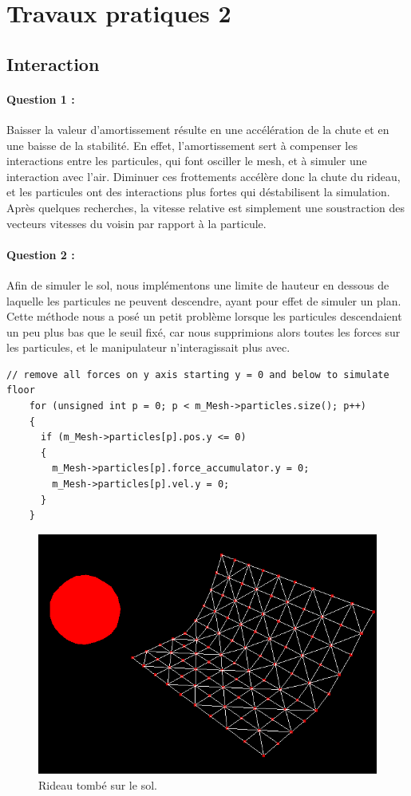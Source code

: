 \documentclass[a4paper,12pt]{article}
\begin{document}
\newpage\section{Travaux pratiques 2}

\subsection{Interaction}
\paragraph{Question 1 :} Baisser la valeur d'amortissement résulte en une accélération de la chute et en une baisse de la stabilité. En effet, l'amortissement sert à compenser les interactions entre les particules, qui font osciller le mesh, et à simuler une interaction avec l'air. Diminuer ces \og{}frottements\fg{} accélère donc la chute du rideau, et les particules ont des interactions plus fortes qui déstabilisent la simulation. Après quelques recherches, la vitesse relative est simplement une soustraction des vecteurs vitesses du voisin par rapport à la particule.

\paragraph{Question 2 :} Afin de simuler le sol, nous implémentons une limite de hauteur en dessous de laquelle les particules ne peuvent descendre, ayant pour effet de simuler un plan. Cette méthode nous a posé un petit problème lorsque les particules descendaient un peu plus bas que le seuil fixé, car nous supprimions alors toutes les forces sur les particules, et le manipulateur n’interagissait plus avec.
\begin{lstlisting}
// remove all forces on y axis starting y = 0 and below to simulate floor
    for (unsigned int p = 0; p < m_Mesh->particles.size(); p++)
    {
      if (m_Mesh->particles[p].pos.y <= 0)
      {
        m_Mesh->particles[p].force_accumulator.y = 0;
        m_Mesh->particles[p].vel.y = 0;
      }
    }
\end{lstlisting}

\begin{figure}[ht!]
  \centering
  \includegraphics[width=\textwidth]{images/sol_image.png}
  \caption{Rideau tombé sur le sol.}
  \label{fig:floor}
\end{figure}
\end{document}
